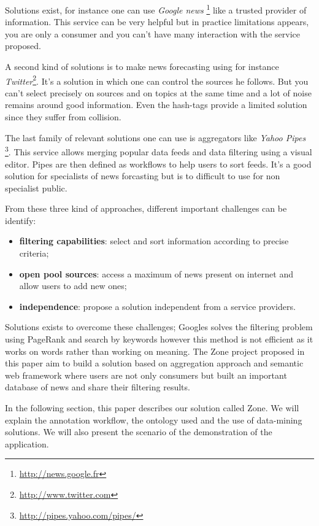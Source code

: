 \documentclass{llncs}
\begin{document}
Solutions exist, for instance one can use \textsl{Google news} \footnote{\url{http://news.google.fr}} like a trusted provider of information. This service can be very helpful but in practice limitations appears, you are only a consumer and you can't have many interaction with the service proposed.

A second kind of solutions is to make news forecasting using for instance \textsl{Twitter}\footnote{\url{http://www.twitter.com}}. It's a solution in which one can control the sources he follows. But you can't select precisely on sources and on topics at the same time and a lot of noise remains around good information. Even the hash-tags provide a limited solution since they suffer from collision.  

The last family of relevant solutions one can use is aggregators like \textsl{Yahoo Pipes} \footnote{\url{http://pipes.yahoo.com/pipes/}}. This service allows merging popular data feeds and data filtering using a visual editor. Pipes are then defined as workflows to help users to sort feeds. It's a good solution for specialists of news forcasting but is to difficult to use for non specialist public.

From these three kind of approaches, different important challenges can be identify:
\begin{itemize}
  \item \textbf{filtering capabilities}: select and sort information according to precise criteria;
  \item \textbf{open pool sources}: access a maximum of news present on internet and allow users to add new ones;
  \item \textbf{independence}: propose a solution independent from a service providers.
\end{itemize}

Solutions exists to overcome these challenges; Googles solves the filtering problem using PageRank and search by keywords \cite{page:brin} however this method is not efficient as it works on words rather than working on meaning. The Zone project proposed in this paper aim to build a solution based on aggregation approach and semantic web framework where users are not only consumers but built an important database of news and share their filtering results.

In the following section, this paper describes our solution called Zone. We will explain the annotation workflow, the ontology used and the use of data-mining solutions. We will also present the scenario of the demonstration of the application.
\end{document}
